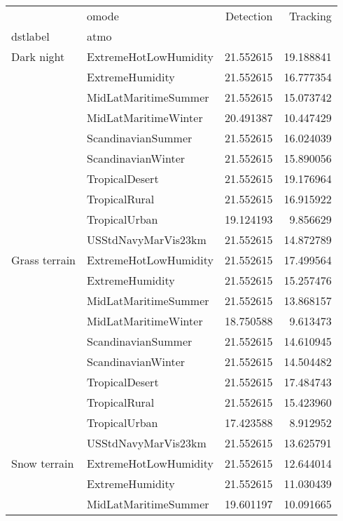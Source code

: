 \begin{tabular}{llrr}
\toprule
             & omode &  Detection &   Tracking \\
dstlabel & atmo &            &            \\
\midrule
Dark night & ExtremeHotLowHumidity &  21.552615 &  19.188841 \\
             & ExtremeHumidity &  21.552615 &  16.777354 \\
             & MidLatMaritimeSummer &  21.552615 &  15.073742 \\
             & MidLatMaritimeWinter &  20.491387 &  10.447429 \\
             & ScandinavianSummer &  21.552615 &  16.024039 \\
             & ScandinavianWinter &  21.552615 &  15.890056 \\
             & TropicalDesert &  21.552615 &  19.176964 \\
             & TropicalRural &  21.552615 &  16.915922 \\
             & TropicalUrban &  19.124193 &   9.856629 \\
             & USStdNavyMarVis23km &  21.552615 &  14.872789 \\
Grass terrain & ExtremeHotLowHumidity &  21.552615 &  17.499564 \\
             & ExtremeHumidity &  21.552615 &  15.257476 \\
             & MidLatMaritimeSummer &  21.552615 &  13.868157 \\
             & MidLatMaritimeWinter &  18.750588 &   9.613473 \\
             & ScandinavianSummer &  21.552615 &  14.610945 \\
             & ScandinavianWinter &  21.552615 &  14.504482 \\
             & TropicalDesert &  21.552615 &  17.484743 \\
             & TropicalRural &  21.552615 &  15.423960 \\
             & TropicalUrban &  17.423588 &   8.912952 \\
             & USStdNavyMarVis23km &  21.552615 &  13.625791 \\
Snow terrain & ExtremeHotLowHumidity &  21.552615 &  12.644014 \\
             & ExtremeHumidity &  21.552615 &  11.030439 \\
             & MidLatMaritimeSummer &  19.601197 &  10.091665 \\

\end{tabular}
